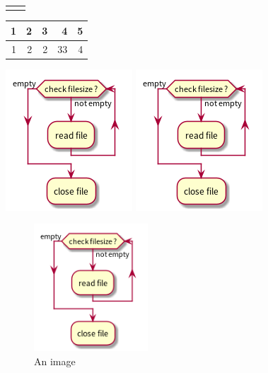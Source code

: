 \documentclass{article}
\begin{document}
\begin{table}[htbp]
\begin{tabular}{p{}|p{}}
\begin{center}
\end{center}\\[0pt]
\end{tabular}
\end{table}

\begin{center}
\begin{tabular}{rrrrr}
1 & 2 & 3 & 4 & 5\\[0pt]
\hline
\hline
1 & 2 & 2 & 33 & 4\\[0pt]
\hline
\end{tabular}
\end{center}



\begin{center}
\includegraphics[height=0.5\textwidth]{./imgs/test.png}
\includegraphics[height=0.5\textwidth]{./imgs/test.png}
\end{center}


\begin{figure}
\centering
\includegraphics[width=0.38\textwidth]{./imgs/test.png}
\caption{\label{fig:org256f208}An image}
\end{figure}
\end{document}

